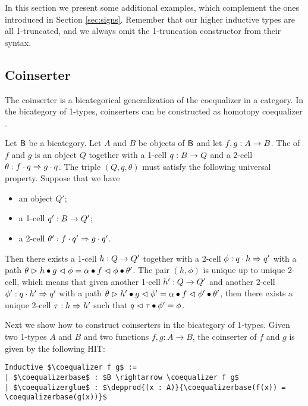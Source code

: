 In this section we present some additional examples, which complement the
ones introduced in Section \ref{sec:signs}. Remember that our higher
inductive types are all 1-truncated, and we always omit the 1-truncation
constructor from their syntax.

\subsection{Coinserter}
\label{sec:coinserter}

The coinserter is a bicategorical generalization of the coequalizer in
a category. In the bicategory of 1-types, coinserters can be constructed as
 homotopy coequalizer \cite[Chapter 6]{hottbook}.

\begin{definition}
Let $\B$ be a bicategory. Let $A$ and $B$ be objects of $\B$ and let
$f,g : A \onecell B$. The  of $f$ and $g$ is an
object $Q$ together with a 1-cell $q : B \onecell Q$ and a 2-cell
$\theta : f \cdot q\twocell g \cdot q$.
The triple $(Q,q,\theta)$ must satisfy the following universal
property. Suppose that we have
\begin{itemize}
\item an object $Q'$;
\item a 1-cell $q' : B \onecell Q'$;
\item a 2-cell $\theta' : f \cdot q' \twocell g \cdot q'$.
\end{itemize}
Then there exists a 1-cell $h : Q \onecell Q'$ together with a 2-cell
$\phi : q \cdot h \twocell q'$ with a path $\theta \whiskerr h \vcomp
g \whiskerl \phi = \lassoc{f}{q}{h} \vcomp f \whiskerl \phi \vcomp
\theta'$. The pair $(h,\phi)$ is unique up to unique 2-cell, which means that
given another 1-cell $h' : Q \onecell Q'$ and another 2-cell $\phi' :
q \cdot h' \twocell q'$ with a path $\theta \whiskerr h' \vcomp g
\whiskerl \phi' = \lassoc{f}{q}{h'} \vcomp f \whiskerl \phi' \vcomp
\theta'$, then there exists a unique 2-cell $\tau : h
\twocell h'$ such that $q \whiskerl \tau \vcomp \phi' = \phi$.
\end{definition}

Next we show how to construct coinserters in the bicategory of 1-types.  Given two 1-types $A$ and $B$ and two
functions $f , g: A \to B$, the coinserter of $f$ and $g$ is
given by the following HIT:
\begin{lstlisting}[mathescape=true]
Inductive $\coequalizer f g$ :=
| $\coequalizerbase$ : $B \rightarrow \coequalizer f g$
| $\coequalizerglue$ : $\depprod{(x : A)}{\coequalizerbase(f(x)) = \coequalizerbase(g(x))}$
\end{lstlisting}


